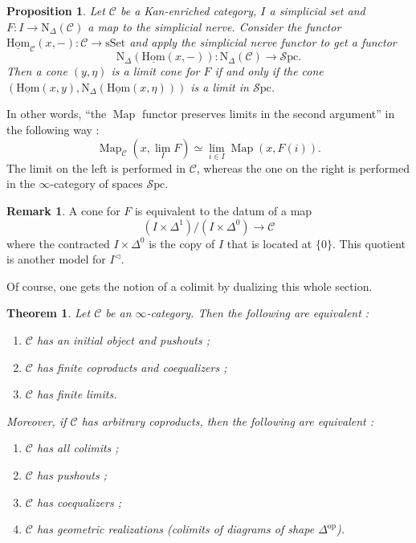 \documentclass[11pt]{article}
\newtheorem{theorem}{Theorem}
\newtheorem{proposition}{Proposition}
\theoremstyle{definition}
\newtheorem{remark}{Remark}
\newcommand{\C}{\mathcal{C}}
\newcommand{\iHom}{\operatorname{\underline{Hom}}}
\newcommand{\Map}{\operatorname{Map}}
\newcommand{\N}{\mathrm{N}}
\newcommand{\op}{\mathrm{op}}
\newcommand{\Spc}{\mathcal{S}\mathrm{pc}}
\newcommand{\sSet}{\mathrm{sSet}}
\begin{document}
\begin{proposition}
    Let $\C$ be a Kan-enriched category, $I$ a simplicial set and $F : I \to \N_{\Delta}(\C)$ a map to the simplicial nerve.
    Consider the functor $\iHom_{\C}(x, -) : \C \to \sSet$ and apply the simplicial nerve functor to get a functor
    \[
        \N_{\Delta}(\iHom(x, -)) : \N_{\Delta}(\C) \to \Spc.
    \]
    Then a cone $(y, \eta)$ is a limit cone for $F$ if and only if the cone $(\iHom(x, y), \N_{\Delta}(\iHom(x, \eta)))$ is a limit in $\Spc$.
\end{proposition}
In other words, \enquote{the $\Map$ functor preserves limits in the second argument} in the following way :
\[
    \Map_{\C}(x, \lim_I F) \simeq \lim_{i \in I} \Map(x, F(i)).
\]
The limit on the left is performed in $\C$, whereas the one on the right is performed in the $\infty$-category of spaces $\Spc$.

\begin{remark}
    A cone for $F$ is equivalent to the datum of a map
    \[
        (I \times \Delta^1)/(I \times \Delta^0) \to \C
    \]
    where the contracted $I \times \Delta^0$ is the copy of $I$ that is located at $\{0\}$.
    This quotient is another model for $I^{\triangleleft}$.
\end{remark}

Of course, one gets the notion of a colimit by dualizing this whole section.

\begin{theorem}
    Let $\C$ be an $\infty$-category.
    Then the following are equivalent :
    \begin{enumerate}
        \item $\C$ has an initial object and pushouts ;
        \item $\C$ has finite coproducts and coequalizers ;
        \item $\C$ has finite limits.
    \end{enumerate}
    Moreover, if $\C$ has arbitrary coproducts, then the following are equivalent :
    \begin{enumerate}
        \item $\C$ has all colimits ;
        \item $\C$ has pushouts ;
        \item $\C$ has coequalizers ;
        \item $\C$ has geometric realizations (colimits of diagrams of shape $\Delta^{\op}$).
    \end{enumerate}
\end{theorem}
\end{document}
